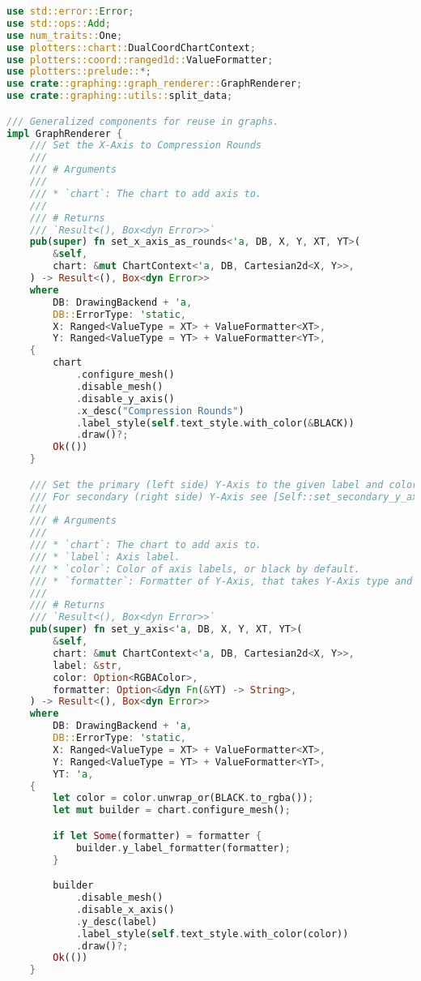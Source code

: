 \begin{lstlisting}[language=rust, caption={graphing/components.rs}]
use std::error::Error;
use std::ops::Add;
use num_traits::One;
use plotters::chart::DualCoordChartContext;
use plotters::coord::ranged1d::ValueFormatter;
use plotters::prelude::*;
use crate::graphing::graph_renderer::GraphRenderer;
use crate::graphing::utils::split_data;

/// Generalized components for reuse in graphs.
impl GraphRenderer {
	/// Set the X-Axis to Compression Rounds
	///
	/// # Arguments
	///
	/// * `chart`: The chart to add axis to.
	///
	/// # Returns
	/// `Result<(), Box<dyn Error>>`
	pub(super) fn set_x_axis_as_rounds<'a, DB, X, Y, XT, YT>(
		&self,
		chart: &mut ChartContext<'a, DB, Cartesian2d<X, Y>>,
	) -> Result<(), Box<dyn Error>>
	where
		DB: DrawingBackend + 'a,
		DB::ErrorType: 'static,
		X: Ranged<ValueType = XT> + ValueFormatter<XT>,
		Y: Ranged<ValueType = YT> + ValueFormatter<YT>,
	{
		chart
			.configure_mesh()
			.disable_mesh()
			.disable_y_axis()
			.x_desc("Compression Rounds")
			.label_style(self.text_style.with_color(&BLACK))
			.draw()?;
		Ok(())
	}

	/// Set the primary (left side) Y-Axis to the given label and color.
	/// For secondary (right side) Y-Axis see [Self::set_secondary_y_axis].
	///
	/// # Arguments
	///
	/// * `chart`: The chart to add axis to.
	/// * `label`: Axis label.
	/// * `color`: Color of axis labels, or black by default.
	/// * `formatter`: Formatter of Y-Axis, that takes Y-Axis type and returns String.
	///
	/// # Returns
	/// `Result<(), Box<dyn Error>>`
	pub(super) fn set_y_axis<'a, DB, X, Y, XT, YT>(
		&self,
		chart: &mut ChartContext<'a, DB, Cartesian2d<X, Y>>,
		label: &str,
		color: Option<RGBAColor>,
		formatter: Option<&dyn Fn(&YT) -> String>,
	) -> Result<(), Box<dyn Error>>
	where
		DB: DrawingBackend + 'a,
		DB::ErrorType: 'static,
		X: Ranged<ValueType = XT> + ValueFormatter<XT>,
		Y: Ranged<ValueType = YT> + ValueFormatter<YT>,
		YT: 'a,
	{
		let color = color.unwrap_or(BLACK.to_rgba());
		let mut builder = chart.configure_mesh();

		if let Some(formatter) = formatter {
			builder.y_label_formatter(formatter);
		}

		builder
			.disable_mesh()
			.disable_x_axis()
			.y_desc(label)
			.label_style(self.text_style.with_color(color))
			.draw()?;
		Ok(())
	}


\end{lstlisting}
